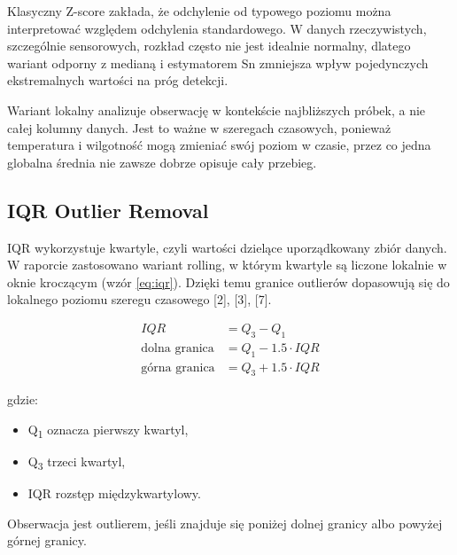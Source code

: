 \documentclass[12pt,twoside]{article}
\begin{document}
Klasyczny Z-score zakłada, że
odchylenie od typowego poziomu można interpretować względem
odchylenia standardowego. W danych rzeczywistych, szczególnie
sensorowych, rozkład często nie jest idealnie normalny, dlatego
wariant odporny z medianą i estymatorem Sn zmniejsza wpływ
pojedynczych ekstremalnych wartości na próg detekcji.


Wariant lokalny analizuje
obserwację w kontekście najbliższych próbek, a nie całej kolumny
danych. Jest to ważne w szeregach czasowych, ponieważ temperatura i
wilgotność mogą zmieniać swój poziom w czasie, przez co jedna
globalna średnia nie zawsze dobrze opisuje cały przebieg.




\subsection{IQR Outlier Removal}


IQR wykorzystuje kwartyle, czyli wartości
dzielące uporządkowany zbiór danych. W raporcie zastosowano
wariant rolling, w którym kwartyle są liczone lokalnie w oknie
kroczącym (wzór \ref{eq:iqr}). Dzięki temu granice outlierów dopasowują się do
lokalnego poziomu szeregu czasowego [2], [3], [7].

\begin{equation}
\label{eq:iqr}
\begin{aligned}
IQR &= Q_3 - Q_1 \\[1ex]
\text{dolna granica} &= Q_1 - 1.5 \cdot IQR \\[1ex]
\text{górna granica} &= Q_3 + 1.5 \cdot IQR
\end{aligned}
\end{equation}

gdzie:



\begin{itemize}

	\item Q\textsubscript{1}
	oznacza pierwszy kwartyl,



	\item Q\textsubscript{3}
	trzeci kwartyl,



	\item IQR rozstęp międzykwartylowy.



\end{itemize}

Obserwacja jest outlierem,
jeśli znajduje się poniżej dolnej granicy albo powyżej górnej
granicy.
\end{document}
